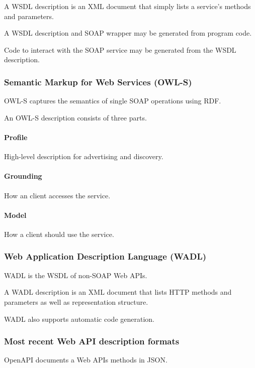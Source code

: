 \documentclass{report}
\begin{document}
A WSDL description is an XML document
that simply lists a service's methods and parameters.

A WSDL description and SOAP wrapper may
be generated from program code.

Code to interact with the SOAP service may
be generated from the WSDL description.

\subsubsection{Semantic Markup for Web Services (OWL-S)}

OWL-S captures the semantics
of single SOAP operations using RDF.

An OWL-S description consists of three parts.

\paragraph{Profile}

High-level description for advertising and discovery.

\paragraph{Grounding}

How an client accesses the service.

\paragraph{Model}

How a client should use the service.

\subsubsection{Web Application Description Language (WADL)}

WADL is the WSDL of non-SOAP Web APIs.

A WADL description is an XML document
that lists HTTP methods and parameters
as well as representation structure.

WADL also supports automatic code generation.

\subsubsection{Most recent Web API description formats}

OpenAPI documents a Web APIs methods in JSON.
\end{document}
